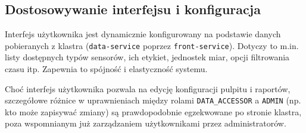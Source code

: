 
\subsection{Dostosowywanie interfejsu i konfiguracja}
Interfejs użytkownika jest dynamicznie konfigurowany na podstawie danych pobieranych z klastra (\texttt{data-service} poprzez \texttt{front-service}). Dotyczy to m.in. listy dostępnych typów sensorów, ich etykiet, jednostek miar, opcji filtrowania czasu itp. Zapewnia to spójność i elastyczność systemu.

Choć interfejs użytkownika pozwala na edycję konfiguracji pulpitu i raportów, szczegółowe różnice w uprawnieniach między rolami \texttt{DATA\_ACCESSOR} a \texttt{ADMIN} (np. kto może zapisywać zmiany) są prawdopodobnie egzekwowane po stronie klastra, poza wspomnianym już zarządzaniem użytkownikami przez administratorów. 

